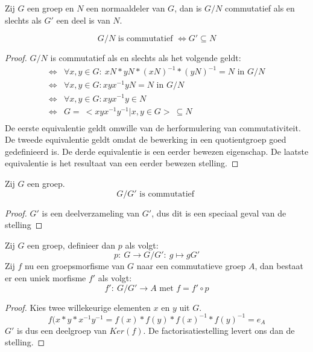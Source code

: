 \documentclass[main.tex]{subfiles}
\begin{document}
\begin{st}
  \label{st:quotientgroep-commutatief-asa-eerste-afgeleide-deelgroep}
  Zij $G$ een groep en $N$ een normaaldeler van $G$, dan is $G/N$ commutatief als en slechts als $G'$ een deel is van $N$.

  \[ G/N \text{ is commutatief } \Leftrightarrow G' \subseteq N \]

  \begin{proof}
    $G/N$ is commutatief als en slechts als het volgende geldt:
    \[
    \begin{array}{rl}
      \Leftrightarrow & \forall x,y \in G:\ xN * yN * (xN)^{-1} * (yN)^{-1} = N \text{ in }G/N\\
      \Leftrightarrow & \forall x,y \in G: xyx^{-1}yN = N \text{ in } G/N\\
      \Leftrightarrow & \forall x,y \in G: xyx^{-1}y \in N\\
      \Leftrightarrow & G =\ < xyx^{-1}y^{-1} | x,y \in G >\ \subseteq N\\ 
    \end{array}
    \]
    De eerste equivalentie geldt omwille van de herformulering van commutativiteit.
    De tweede equivalentie geldt omdat de bewerking in een quotientgroep goed gedefinieerd is.
    De derde equivalentie is een eerder bewezen eigenschap.
    De laatste equivalentie is het resultaat van een eerder bewezen stelling.
  \end{proof}
\end{st}

\begin{gev}
 \label{gev:afgeleide-door-groep-is-commutatief}
  Zij $G$ een groep.
  \[ G/G' \text{ is commutatief } \]

  \begin{proof}
    $G'$ is een deelverzameling van $G'$, dus dit is een speciaal geval van de stelling
  \end{proof}
\end{gev}

\begin{st}
  Zij $G$ een groep, definieer dan $p$ als volgt:
  \[ p:\ G \rightarrow G/G':\ g \mapsto gG' \]
  Zij $f$ nu een groepsmorfisme van $G$ naar een commutatieve groep $A$, dan bestaat er een uniek morfisme $f'$ als volgt:
  \[ f':\ G/G' \rightarrow A \text{ met } f = f'\circ p \]

  \begin{proof}
    Kies twee willekeurige elementen $x$ en $y$ uit $G$.
    \[ f(x*y*x^{-1}y^{-1} = f(x) * f(y) * f(x)^{-1} * f(y)^{-1} = e_{A} \]
    $G'$ is dus een deelgroep van $Ker(f)$.
    De factorisatiestelling levert ons dan de stelling.
  \end{proof}
\end{st}
\end{document}
